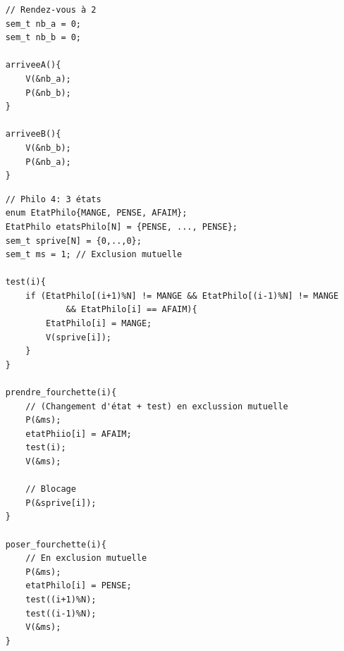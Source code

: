 \documentclass[11pt]{article}
\begin{document}
\begin{verbatim}
    // Rendez-vous à 2
    sem_t nb_a = 0;
    sem_t nb_b = 0;

    arriveeA(){
        V(&nb_a);
        P(&nb_b);
    }

    arriveeB(){
        V(&nb_b);
        P(&nb_a);
    }
\end{verbatim}

\pagebreak

\begin{verbatim}
    // Philo 4: 3 états
    enum EtatPhilo{MANGE, PENSE, AFAIM};
    EtatPhilo etatsPhilo[N] = {PENSE, ..., PENSE};
    sem_t sprive[N] = {0,..,0};
    sem_t ms = 1; // Exclusion mutuelle

    test(i){
        if (EtatPhilo[(i+1)%N] != MANGE && EtatPhilo[(i-1)%N] != MANGE 
                && EtatPhilo[i] == AFAIM){
            EtatPhilo[i] = MANGE;
            V(sprive[i]);
        }
    }

    prendre_fourchette(i){
        // (Changement d'état + test) en exclussion mutuelle 
        P(&ms);
        etatPhiio[i] = AFAIM;
        test(i);
        V(&ms);

        // Blocage
        P(&sprive[i]);
    }

    poser_fourchette(i){
        // En exclusion mutuelle
        P(&ms);
        etatPhilo[i] = PENSE;
        test((i+1)%N);
        test((i-1)%N);
        V(&ms);
    }
\end{verbatim}

\pagebreak
\end{document}
